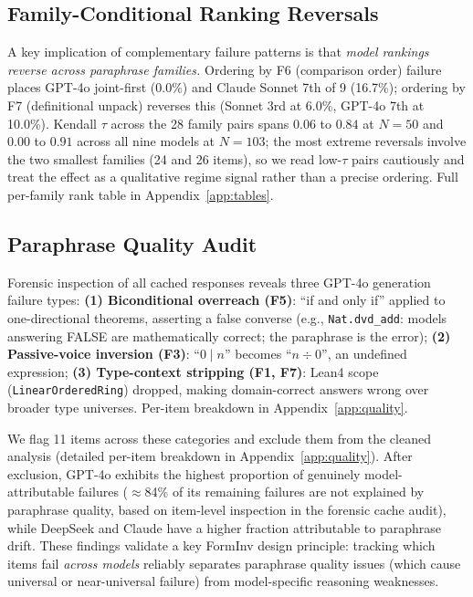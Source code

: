 \documentclass{article}
\begin{document}
\subsection{Family-Conditional Ranking Reversals}
\label{sec:reversals}

A key implication of complementary failure patterns is that \emph{model rankings reverse across paraphrase families.} Ordering by F6 (comparison order) failure places GPT-4o joint-first (0.0\%) and Claude Sonnet 7th of 9 (16.7\%); ordering by F7 (definitional unpack) reverses this (Sonnet 3rd at 6.0\%, GPT-4o 7th at 10.0\%). Kendall $\tau$ across the 28 family pairs spans $0.06$ to $0.84$ at $N=50$ and $0.00$ to $0.91$ across all nine models at $N=103$; the most extreme reversals involve the two smallest families (24 and 26 items), so we read low-$\tau$ pairs cautiously and treat the effect as a qualitative regime signal rather than a precise ordering. Full per-family rank table in Appendix~\ref{app:tables}.

\subsection{Paraphrase Quality Audit}
\label{sec:quality}

Forensic inspection of all cached responses reveals three GPT-4o generation failure types:
\textbf{(1) Biconditional overreach (F5)}: ``if and only if'' applied to one-directional theorems, asserting a false converse
(e.g., \texttt{Nat.dvd\_add}: models answering FALSE are mathematically correct; the paraphrase is the error);
\textbf{(2) Passive-voice inversion (F3)}: ``$0 \mid n$'' becomes ``$n \div 0$'', an undefined expression;
\textbf{(3) Type-context stripping (F1, F7)}: Lean4 scope (\texttt{LinearOrderedRing}) dropped, making
domain-correct answers wrong over broader type universes.
Per-item breakdown in Appendix~\ref{app:quality}.

We flag 11 items across these categories and exclude them from the cleaned analysis
(detailed per-item breakdown in Appendix~\ref{app:quality}).
After exclusion, GPT-4o exhibits the highest proportion of genuinely model-attributable failures
($\approx$84\% of its remaining failures are not explained by paraphrase quality,
based on item-level inspection in the forensic cache audit),
while DeepSeek and Claude have a higher fraction attributable to paraphrase drift.
These findings validate a key FormInv design principle: tracking which items fail
\emph{across models} reliably separates paraphrase quality issues (which cause universal
or near-universal failure) from model-specific reasoning weaknesses.
\end{document}
